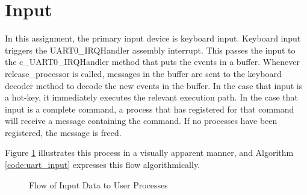 \documentclass[12pt]{report}
\begin{document}
\section{Input}
\label{sec:Input}
    In this assignment, the primary input device is keyboard input.
    Keyboard input triggers the UART0\_IRQHandler assembly interrupt. This
    passes the input to the c\_UART0\_IRQHandler method that puts the events
    in a buffer. Whenever release\_processor is called, messages in the
    buffer are sent to the keyboard decoder method to decode the new
    events in the buffer. In the case that input is a hot-key,
    it immediately executes the relevant execution path. In the case that input
    is a complete command, a process that has registered for that command will
    receive a message containing the command. If no processes have been
    registered, the message is freed.

    Figure \ref{fig:inputFigure} illustrates this process in a visually
    apparent manner, and Algorithm \ref{code:uart_input} expresses this flow
    algorithmically.

    \begin{figure}
        \centering
        \caption{Flow of Input Data to User Processes}
        \label{fig:inputFigure}
    \end{figure}
\end{document}
